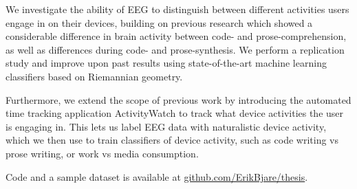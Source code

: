 We investigate the ability of EEG to distinguish between different activities users engage in on their devices, building on previous research which showed a considerable difference in brain activity between code- and prose-comprehension, as well as differences during code- and prose-synthesis. We perform a replication study and improve upon past results using state-of-the-art machine learning classifiers based on Riemannian geometry.

Furthermore, we extend the scope of previous work by introducing the automated time tracking application ActivityWatch to track what device activities the user is engaging in. This lets us label EEG data with naturalistic device activity, which we then use to train classifiers of device activity, such as code writing vs prose writing, or work vs media consumption.

Code and a sample dataset is available at \href{https://github.com/ErikBjare/thesis}{github.com/ErikBjare/thesis}.
